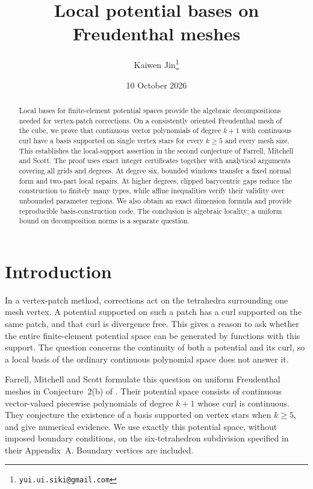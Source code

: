 \documentclass[11pt]{article}
\title{Local potential bases on Freudenthal meshes}
\author{Kaiwen Jin\thanks{\texttt{yui.ui.siki@gmail.com}}}
\date{10 October 2026}
\theoremstyle{remark}
\begin{document}
\maketitle

\begin{abstract}
Local bases for finite-element potential spaces provide the algebraic
decompositions needed for vertex-patch corrections. On a consistently oriented
Freudenthal mesh of the cube, we prove that continuous vector polynomials of
degree $k+1$ with continuous curl have a basis supported on single vertex
stars for every $k\ge5$ and every mesh size. This establishes the local-support
assertion in the second conjecture of Farrell, Mitchell and Scott. The proof
uses exact integer certificates together with analytical arguments covering
all grids and degrees. At degree six, bounded windows transfer a fixed normal
form and two-part local repairs. At higher degrees, clipped barycentric gaps
reduce the construction to finitely many types, while affine inequalities
verify their validity over unbounded parameter regions. We also obtain an
exact dimension formula and provide reproducible basis-construction code.
The conclusion is algebraic locality; a uniform bound on decomposition norms
is a separate question.
\end{abstract}

\section{Introduction}

In a vertex-patch method, corrections act on the tetrahedra surrounding one
mesh vertex. A potential supported on such a patch has a curl supported on
the same patch, and that curl is divergence free. This gives a reason to ask
whether the entire finite-element potential space can be generated by
functions with this support. The question concerns the continuity of both a
potential and its curl, so a local basis of the ordinary continuous polynomial
space does not answer it.

Farrell, Mitchell and Scott formulate this question on uniform Freudenthal
meshes in Conjecture~2(b) of \cite[\S3.3]{FMS}. Their potential space consists
of continuous vector-valued piecewise polynomials of degree $k+1$ whose curl
is continuous. They conjecture the existence of a basis supported on vertex
stars when $k\ge5$, and give numerical evidence. We use exactly this
potential space, without imposed boundary conditions, on the six-tetrahedron
subdivision specified in their Appendix~A. Boundary vertices are included.
\end{document}
